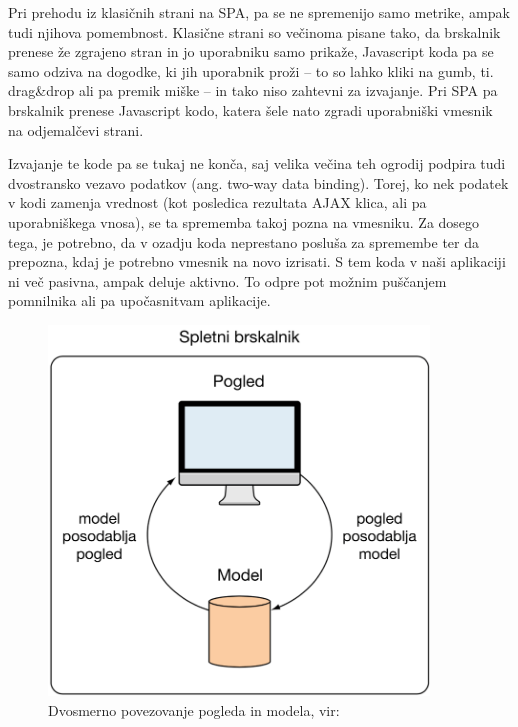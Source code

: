 \documentclass[a4paper, 12pt]{book}
\begin{document}
Pri prehodu iz klasičnih strani na SPA, pa se ne spremenijo samo metrike, ampak tudi njihova pomembnost. Klasične strani so večinoma pisane tako, da brskalnik prenese že zgrajeno stran in jo uporabniku samo prikaže, Javascript koda pa se samo odziva na dogodke, ki jih uporabnik proži – to so lahko kliki na gumb, ti. drag\&drop ali pa premik miške – in tako niso zahtevni za izvajanje. Pri SPA pa brskalnik prenese Javascript kodo, katera šele nato zgradi uporabniški vmesnik na odjemalčevi strani.

Izvajanje te kode pa se tukaj ne konča, saj velika večina teh ogrodij podpira tudi dvostransko vezavo podatkov (ang. two-way data binding). Torej, ko nek podatek v kodi zamenja vrednost (kot posledica rezultata AJAX klica, ali pa uporabniškega vnosa), se ta sprememba takoj pozna na vmesniku. Za dosego tega, je potrebno, da v ozadju koda neprestano posluša za spremembe ter da prepozna, kdaj je potrebno vmesnik na novo izrisati. S tem koda v naši aplikaciji ni več pasivna, ampak deluje aktivno. To odpre pot možnim puščanjem pomnilnika ali pa upočasnitvam aplikacije.

\begin{figure}[h]
	\begin{center}
		\includegraphics[width=0.9\textwidth]{AngularJS_dvosmerno_povezovanje.png}
	\end{center}
	\caption{Dvosmerno povezovanje pogleda in modela, vir: \cite{sp_skripta}}
	\label{img:angularjs_two_way_databind}
\end{figure}
\end{document}

